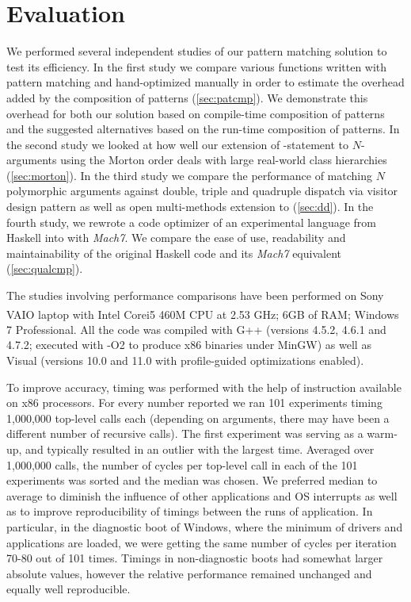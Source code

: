 \section{Evaluation} %
\label{sec:eval}

We performed several independent studies of our pattern matching solution to 
test its efficiency. In the first study we compare various functions written 
with pattern matching and hand-optimized manually in order to estimate the 
overhead added by the composition of patterns (\textsection\ref{sec:patcmp}). 
We demonstrate this overhead for both our solution based on compile-time 
composition of patterns and the suggested alternatives based on the run-time 
composition of patterns. In the second study we looked at how well our extension 
of -statement to $N$-arguments using the Morton order deals with 
large real-world class hierarchies (\textsection\ref{sec:morton}). In the third 
study we compare the performance of matching $N$ polymorphic arguments against 
double, triple and quadruple dispatch via visitor design pattern as well as 
open multi-methods extension to \Cpp{} (\textsection\ref{sec:dd}). In the fourth 
study, we rewrote a code optimizer of an experimental language from Haskell into 
\Cpp{} with \emph{Mach7}. We compare the ease of use, readability and maintainability 
of the original Haskell code and its \emph{Mach7} equivalent 
(\textsection\ref{sec:qualcmp}).

The studies involving performance comparisons have been performed on 
Sony VAIO\textsuperscript{\textregistered} laptop with 
Intel\textsuperscript{\textregistered} Core\texttrademark i5 460M CPU at 2.53 
GHz; 6GB of RAM; Windows 7 Professional. All the code was compiled with G++ 
(versions 4.5.2, 4.6.1 and 4.7.2; executed with -O2 to produce x86 binaries 
under MinGW) as well as Visual \Cpp{} (versions 10.0 and 11.0 with 
profile-guided optimizations enabled).
 
To improve accuracy, timing was performed with the help of  
instruction available on x86 processors. For every number reported we ran 
101 experiments timing 1,000,000 top-level calls each (depending on arguments, 
there may have been a different number of recursive calls). The first experiment 
was serving as a warm-up, and typically resulted in an outlier with the largest 
time. Averaged over 1,000,000 calls, the number of cycles per top-level call in 
each of the 101 experiments was sorted and the median was chosen. We preferred 
median to average to diminish the influence of other applications and OS 
interrupts as well as to improve reproducibility of timings between the runs of 
application. In particular, in the diagnostic boot of Windows, where the minimum 
of drivers and applications are loaded, we were getting the same number of 
cycles per iteration 70-80 out of 101 times. Timings in non-diagnostic boots had 
somewhat larger absolute values, however the relative performance remained 
unchanged and equally well reproducible.

